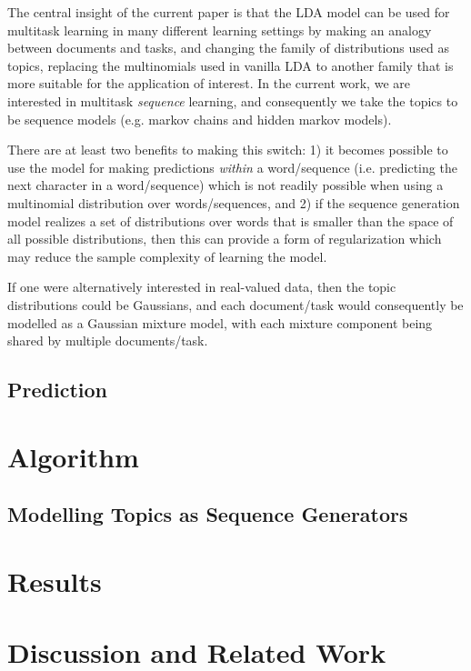 \documentclass[letterpaper]{article}
\newcommand{\eg}{e.g. }
\newcommand{\ie}{i.e. }
\begin{document}
The central insight of the current paper is that the LDA model can be used for multitask learning in many different learning settings by making an analogy between documents and tasks, and changing the family of distributions used as topics, replacing the multinomials used in vanilla LDA to another family that is more suitable for the application of interest. In the current work, we are interested in multitask \textit{sequence} learning, and consequently we take the topics to be sequence models (\eg markov chains and hidden markov models).

There are at least two benefits to making this switch: 1) it becomes possible to use the model for making predictions \textit{within} a word/sequence (\ie predicting the next character in a word/sequence) which is not readily possible when using a multinomial distribution over words/sequences, and 2) if the sequence generation model realizes a set of distributions over words that is smaller than the space of all possible distributions, then this can provide a form of regularization which may reduce the sample complexity of learning the model.

If one were alternatively interested in real-valued data, then the topic distributions could be Gaussians, and each document/task would consequently be modelled as a Gaussian mixture model, with each mixture component being shared by multiple documents/task.


\subsection{Prediction}

\section{Algorithm}
\subsection{Modelling Topics as Sequence Generators}

\section{Results}

\section{Discussion and Related Work}
\end{document}
